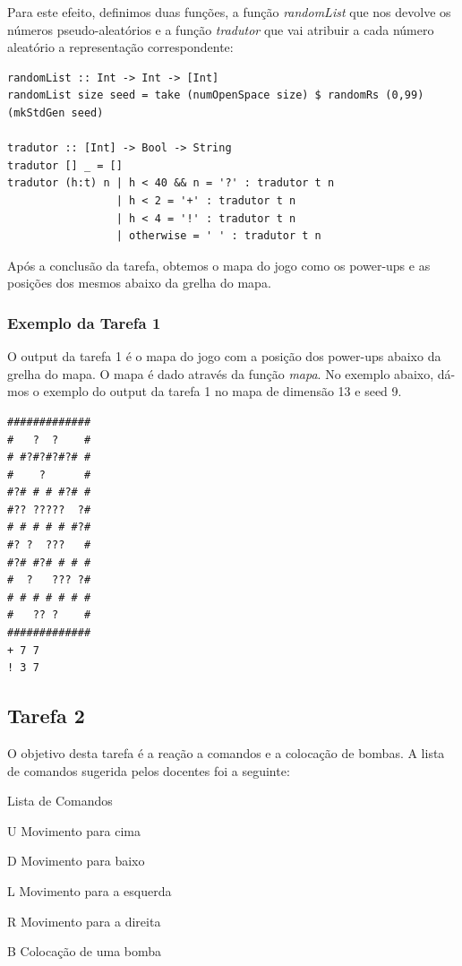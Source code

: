 \documentclass[a4paper]{article}
\begin{document}
Para este efeito, definimos duas funções, a função \emph{randomList} que nos devolve os números pseudo-aleatórios e a função \emph{tradutor} que vai atribuir a cada número aleatório a representação correspondente:

\vspace{0.5cm}

\begin{verbatim}
randomList :: Int -> Int -> [Int]
randomList size seed = take (numOpenSpace size) $ randomRs (0,99) (mkStdGen seed)

tradutor :: [Int] -> Bool -> String
tradutor [] _ = []
tradutor (h:t) n | h < 40 && n = '?' : tradutor t n
                 | h < 2 = '+' : tradutor t n
                 | h < 4 = '!' : tradutor t n
                 | otherwise = ' ' : tradutor t n 
\end{verbatim}

\vspace{0.5cm}

Após a conclusão da tarefa, obtemos o mapa do jogo como os power-ups e as posições dos mesmos abaixo da grelha do mapa.

\subsubsection{Exemplo da Tarefa 1}

O output da tarefa 1 é o mapa do jogo com a posição  dos power-ups abaixo da grelha do mapa. O mapa é dado através da função \emph{mapa}. No exemplo abaixo, dá-mos o exemplo do output da tarefa 1 no mapa de dimensão 13 e seed 9.

\begin{verbatim}
#############
#   ?  ?    #
# #?#?#?#?# #
#    ?      #
#?# # # #?# #
#?? ?????  ?#
# # # # # #?#
#? ?  ???   #
#?# #?# # # #
#  ?   ??? ?#
# # # # # # #
#   ?? ?    #
#############
+ 7 7
! 3 7
\end{verbatim}

\newpage

\subsection{Tarefa 2} O objetivo desta tarefa é a reação a comandos e a colocação de bombas. A lista de comandos sugerida pelos docentes foi a seguinte:

\vspace{0.5cm}

\begin{labeling}{Lista de Comandos}
      \item [U] Movimento para cima
      \item [D] Movimento para baixo 
      \item [L] Movimento para a esquerda
      \item [R] Movimento para a direita
      \item [B] Colocação de uma bomba
\end{labeling}
\end{document}
